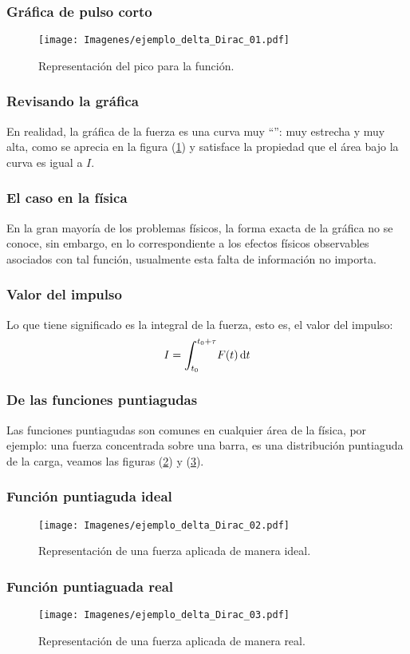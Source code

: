 \documentclass[12pt]{beamer}
\begin{document}
\begin{frame}
\frametitle{Gráfica de pulso corto}
\begin{figure}[H]
    \centering
    \texttt{[image: Imagenes/ejemplo\_delta\_Dirac\_01.pdf]}
    \caption{Representación del pico para la función.}
    \label{fig:figura_delta_Dirac_01}
\end{figure}
\end{frame}
\begin{frame}
\frametitle{Revisando la gráfica}
En realidad, la gráfica de la fuerza es una curva muy \enquote{}: muy estrecha y muy alta, como se aprecia en la figura (\ref{fig:figura_delta_Dirac_01}) \pause y satisface la propiedad que el área bajo la curva es igual a $I$.
\end{frame}
\begin{frame}
\frametitle{El caso en la física}
En la gran mayoría de los problemas físicos, la forma exacta de la gráfica no se conoce, \pause sin embargo, en lo correspondiente a los efectos físicos observables asociados con tal función, usualmente esta falta de información no importa.
\end{frame}
\begin{frame}
\frametitle{Valor del impulso}
Lo que tiene significado es la integral de la fuerza, esto es, el valor del impulso:
\pause
\begin{align*}
I = \scaleint{6ex}_{\bs t_{0}}^{t_{0} + \tau } F (t) \dd{t}
\end{align*}
\end{frame}
\begin{frame}
\frametitle{De las funciones puntiagudas}
Las funciones puntiagudas son comunes en cualquier área de la física, \pause por ejemplo: una fuerza concentrada sobre una barra, es una distribución puntiaguda de la carga, \pause veamos las figuras (\ref{fig:figura_delta_Dirac_02}) y (\ref{fig:figura_delta_Dirac_03}). 
\end{frame}
\begin{frame}
\frametitle{Función puntiaguda ideal}
\begin{figure}[H]
    \centering
    \texttt{[image: Imagenes/ejemplo\_delta\_Dirac\_02.pdf]}
    \caption{Representación de una fuerza aplicada de manera ideal.}
    \label{fig:figura_delta_Dirac_02}
\end{figure}
\end{frame}
\begin{frame}
\frametitle{Función puntiaguada real}
\begin{figure}[H]
    \centering
    \texttt{[image: Imagenes/ejemplo\_delta\_Dirac\_03.pdf]}
    \caption{Representación de una fuerza aplicada de manera real.}
    \label{fig:figura_delta_Dirac_03}
\end{figure}
\end{frame}
\end{document}
